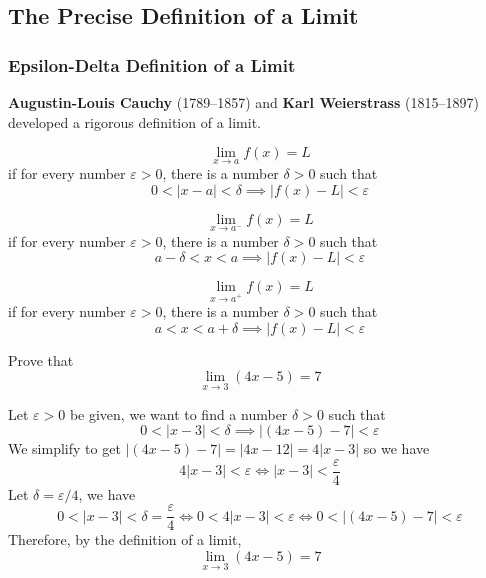 \subsection{The Precise Definition of a Limit}

\subsubsection{Epsilon-Delta Definition of a Limit}
\textbf{Augustin-Louis Cauchy} (1789--1857) and \textbf{Karl Weierstrass}
(1815--1897) developed a rigorous definition of a limit.
\begin{definition}
    \[\lim_{x\to a}f(x)=L\] if for every number \(\varepsilon>0\), there is a
    number \(\delta>0\) such that \[0<|x-a|<\delta\implies|f(x)-L|<\varepsilon\]
\end{definition}
\begin{definition}
    \[\lim_{x\to a^-}f(x)=L\] if for every number \(\varepsilon>0\), there is a
    number \(\delta>0\) such that \[a-\delta<x<a\implies|f(x)-L|<\varepsilon\]
\end{definition}
\begin{definition}
    \[\lim_{x\to a^+}f(x)=L\] if for every number \(\varepsilon>0\), there is a
    number \(\delta>0\) such that \[a<x<a+\delta\implies|f(x)-L|<\varepsilon\]
\end{definition}
\begin{problem}
    Prove that \[\lim_{x\to 3}(4x-5)=7\]
\end{problem}
\begin{solution}
    Let \(\varepsilon>0\) be given, we want to find a number \(\delta>0\) such
    that \[0<|x-3|<\delta \implies |(4x-5)-7|<\varepsilon\]
    We simplify to get \(|(4x-5)-7|=|4x-12|=4|x-3|\) so we have
    \[4|x-3|<\varepsilon \iff |x-3|<\frac{\varepsilon}{4}\]
    Let \(\delta=\varepsilon/4\), we have
    \[0<|x-3|<\delta=\frac{\varepsilon}{4} \iff 0<4|x-3|<\varepsilon \iff
    0<|(4x-5)-7|<\varepsilon\]
    Therefore, by the definition of a limit, \[\lim_{x\to 3}(4x-5)=7\]
\end{solution}